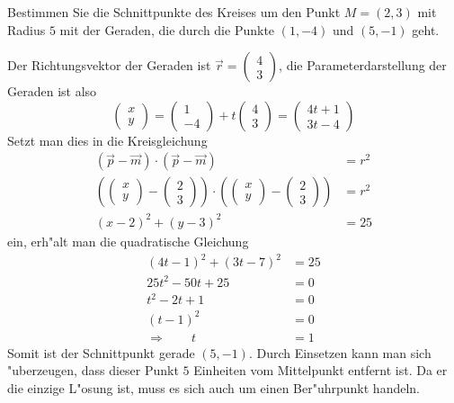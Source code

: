 Bestimmen Sie die Schnittpunkte des Kreises um den Punkt $M=(2,3)$
mit Radius $5$ mit der Geraden, die durch die Punkte $(1,-4)$
und $(5,-1)$ geht.

\begin{loesung}
Der Richtungsvektor der Geraden ist $\vec r=\begin{pmatrix}4\\3\end{pmatrix}$,
die Parameterdarstellung der Geraden ist also
\[
\begin{pmatrix}x\\y\end{pmatrix}
=
\begin{pmatrix}1\\-4\end{pmatrix}
+t
\begin{pmatrix}4\\3\end{pmatrix}
=
\begin{pmatrix}4t+1\\3t-4\end{pmatrix}
\]
Setzt man dies in die Kreisgleichung
\begin{align*}
(\vec p-\vec m)\cdot(\vec p-\vec m)&=r^2\\
\left(
\begin{pmatrix}x\\y\end{pmatrix}
-
\begin{pmatrix}2\\3\end{pmatrix}
\right)
\cdot
\left(
\begin{pmatrix}x\\y\end{pmatrix}
-
\begin{pmatrix}2\\3\end{pmatrix}
\right)
&=r^2
\\
(x-2)^2+(y-3)^2&=25
\end{align*}
ein, erh"alt man die quadratische Gleichung
\begin{align*}
(4t-1)^2+(3t-7)^2&=25
\\
25t^2-50t+25&=0
\\
t^2-2t+1&=0
\\
(t-1)^2&=0
\\
\Rightarrow\qquad t&=1
\end{align*}
Somit ist der Schnittpunkt gerade $(5,-1)$. Durch Einsetzen kann
man sich "uberzeugen, dass dieser Punkt $5$ Einheiten vom Mittelpunkt
entfernt ist. Da er die einzige L"osung ist, muss es sich auch um
einen Ber"uhrpunkt handeln.
\end{loesung}

